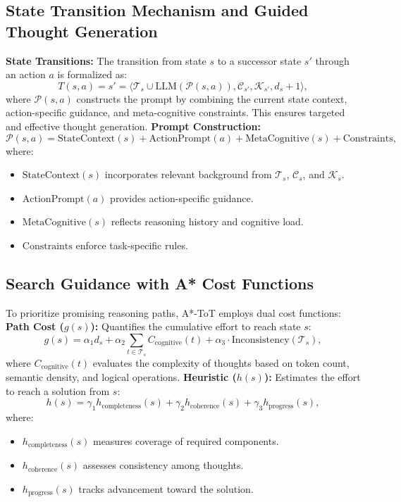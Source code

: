 \documentclass[12pt]{article}
\begin{document}
\subsection{State Transition Mechanism and Guided Thought Generation}
\textbf{State Transitions:} The transition from state $s$ to a successor state $s'$ through an action $a$ is formalized as:
\[
T(s, a) = s' = \langle \mathcal{T}_s \cup \text{LLM}(\mathcal{P}(s, a)), \mathcal{C}_{s'}, \mathcal{K}_{s'}, d_s + 1 \rangle,
\]
where $\mathcal{P}(s, a)$ constructs the prompt by combining the current state context, action-specific guidance, and meta-cognitive constraints. This ensures targeted and effective thought generation.
\textbf{Prompt Construction:}
\[
\mathcal{P}(s, a) = \text{StateContext}(s) + \text{ActionPrompt}(a) + \text{MetaCognitive}(s) + \text{Constraints},
\]
where:
\begin{itemize}
    \item $\text{StateContext}(s)$ incorporates relevant background from $\mathcal{T}_s$, $\mathcal{C}_s$, and $\mathcal{K}_s$.
    \item $\text{ActionPrompt}(a)$ provides action-specific guidance.
    \item $\text{MetaCognitive}(s)$ reflects reasoning history and cognitive load.
    \item $\text{Constraints}$ enforce task-specific rules.
\end{itemize}
\subsection{Search Guidance with A* Cost Functions}
To prioritize promising reasoning paths, A*-ToT employs dual cost functions:
\textbf{Path Cost ($g(s)$):} Quantifies the cumulative effort to reach state $s$:
\[
g(s) = \alpha_1 d_s + \alpha_2 \sum_{t \in \mathcal{T}_s} C_{\text{cognitive}}(t) + \alpha_3 \cdot \text{Inconsistency}(\mathcal{T}_s),
\]
where $C_{\text{cognitive}}(t)$ evaluates the complexity of thoughts based on token count, semantic density, and logical operations.
\textbf{Heuristic ($h(s)$):} Estimates the effort to reach a solution from $s$:
\[
h(s) = \gamma_1 h_{\text{completeness}}(s) + \gamma_2 h_{\text{coherence}}(s) + \gamma_3 h_{\text{progress}}(s),
\]
where:
\begin{itemize}
    \item $h_{\text{completeness}}(s)$ measures coverage of required components.
    \item $h_{\text{coherence}}(s)$ assesses consistency among thoughts.
    \item $h_{\text{progress}}(s)$ tracks advancement toward the solution.
\end{itemize}
\end{document}
